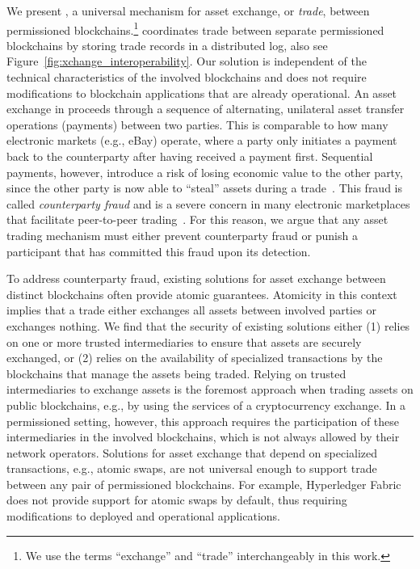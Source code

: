 We present \emph{\ModelName{}}, a universal mechanism for asset exchange, or \emph{trade}, between permissioned blockchains.\footnote{We use the terms \enquote{exchange} and \enquote{trade} interchangeably in this work.}
\ModelName{} coordinates trade between separate permissioned blockchains by storing trade records in a distributed log, also see Figure~\ref{fig:xchange_interoperability}.
Our solution is independent of the technical characteristics of the involved blockchains and does not require modifications to blockchain applications that are already operational.
An asset exchange in \ModelName{} proceeds through a sequence of alternating, unilateral asset transfer operations (payments) between two parties.
This is comparable to how many electronic markets (e.g., eBay) operate, where a party only initiates a payment back to the counterparty after having received a payment first.
Sequential payments, however, introduce a risk of losing economic value to the other party, since the other party is now able to \enquote{steal} assets during a trade~\cite{koens2019assessing}.
This fraud is called \emph{counterparty fraud} and is a severe concern in many electronic marketplaces that facilitate peer-to-peer trading~\cite{peters2016understanding}.
For this reason, we argue that any asset trading mechanism must either prevent counterparty fraud or punish a participant that has committed this fraud upon its detection.

To address counterparty fraud, existing solutions for asset exchange between distinct blockchains often provide atomic guarantees.
Atomicity in this context implies that a trade either exchanges all assets between involved parties or exchanges nothing.
We find that the security of existing solutions either (1) relies on one or more trusted intermediaries to ensure that assets are securely exchanged, or (2) relies on the availability of specialized transactions by the blockchains that manage the assets being traded.
Relying on trusted intermediaries to exchange assets is the foremost approach when trading assets on public blockchains, e.g., by using the services of a cryptocurrency exchange.
In a permissioned setting, however, this approach requires the participation of these intermediaries in the involved blockchains, which is not always allowed by their network operators.
Solutions for asset exchange that depend on specialized transactions, e.g., atomic swaps, are not universal enough to support trade between any pair of permissioned blockchains.
For example, Hyperledger Fabric does not provide support for atomic swaps by default, thus requiring modifications to deployed and operational applications.

